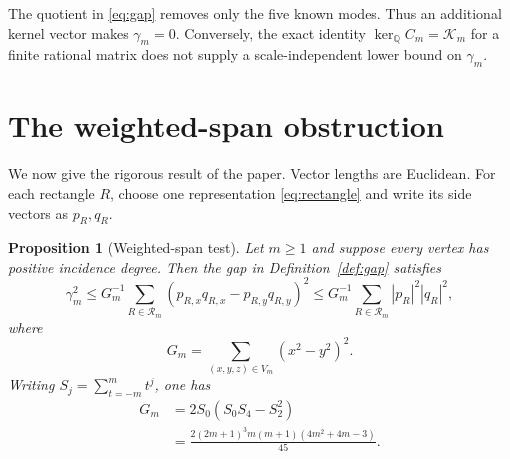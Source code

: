 \documentclass[11pt]{article}
\newtheorem{proposition}[theorem]{Proposition}
\theoremstyle{definition}
\theoremstyle{remark}
\begin{document}
The quotient in \eqref{eq:gap} removes only the five known modes.  Thus an
additional kernel vector makes $\gamma_m=0$.  Conversely, the exact identity
$\ker_{\mathbb Q}C_m=\mathcal K_m$ for a finite rational matrix does not
supply a scale-independent lower bound on $\gamma_m$.

\section{The weighted-span obstruction}\label{sec:theorem}

We now give the rigorous result of the paper.  Vector lengths are Euclidean.
For each rectangle $R$, choose one representation \eqref{eq:rectangle} and
write its side vectors as $p_R,q_R$.

\begin{proposition}[Weighted-span test]\label{prop:weighted-span}
Let $m\geq1$ and suppose every vertex has positive incidence degree.  Then
the gap in Definition~\ref{def:gap} satisfies
\begin{equation}\label{eq:weighted-chain}
 \gamma_m^2\leq
 G_m^{-1}\sum_{R\in\mathcal R_m}(p_{R,x}q_{R,x}-p_{R,y}q_{R,y})^2
 \leq G_m^{-1}\sum_{R\in\mathcal R_m}|p_R|^2|q_R|^2,
\end{equation}
where
\[
 G_m=\sum_{(x,y,z)\in V_m}(x^2-y^2)^2.
\]
Writing $S_j=\sum_{t=-m}^m t^j$, one has
\begin{align}
 G_m
 &=2S_0(S_0S_4-S_2^2)\label{eq:G-moment}\\
 &=\frac{2(2m+1)^3m(m+1)(4m^2+4m-3)}{45}.\label{eq:G-closed}
\end{align}
\end{proposition}
\end{document}
